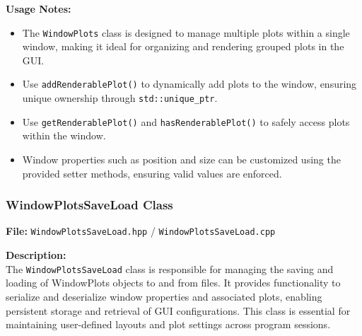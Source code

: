 \documentclass{article}
\begin{document}
\vspace{5pt}
\noindent
\textbf{Usage Notes:}
\begin{itemize}
    \item The \texttt{WindowPlots} class is designed to manage multiple plots within a single window, making it ideal for organizing and rendering grouped plots in the GUI.

    \item Use \texttt{addRenderablePlot()} to dynamically add plots to the window, ensuring unique ownership through \texttt{std::unique\_ptr}.
    
    \item Use \texttt{getRenderablePlot()} and \texttt{hasRenderablePlot()} to safely access plots within the window.

    \item Window properties such as position and size can be customized using the provided setter methods, ensuring valid values are enforced.
\end{itemize}


\vspace{10pt}
\subsubsection{WindowPlotsSaveLoad Class}
\textbf{File:} \texttt{WindowPlotsSaveLoad.hpp} / \texttt{WindowPlotsSaveLoad.cpp} 

\vspace{5pt}
\noindent
\textbf{Description:}
\\
\noindent
The \texttt{WindowPlotsSaveLoad} class is responsible for managing the saving and loading of WindowPlots objects to and from files. It provides functionality to serialize and deserialize window properties and associated plots, enabling persistent storage and retrieval of GUI configurations. This class is essential for maintaining user-defined layouts and plot settings across program sessions.
\end{document}
